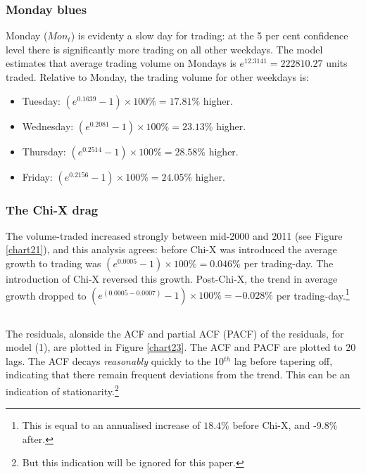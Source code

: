 \documentclass{article}\usepackage[]{graphicx}\usepackage[]{color}
\begin{document}
\subsubsection*{Monday blues}
\vspace*{-6mm}
  Monday ($Mon_t$) is evidenty a slow day for trading: at the 5 per cent confidence level there is significantly more trading on all other weekdays. 
  The model estimates that average trading volume on Mondays is $e^{12.3141}=222810.27$ units traded. Relative to Monday, the trading volume for other weekdays is:
  \begin{itemize}
    \item Tuesday:  $(e^{0.1639}-1)\times 100\%=17.81\%$  higher.
    \item Wednesday:  $(e^{0.2081}-1)\times 100\%=23.13\%$ higher. 
    \item Thursday:  $(e^{0.2514}-1)\times 100\%=28.58\%$  higher.
    \item Friday:  $(e^{0.2156}-1)\times 100\%=24.05\%$  higher.
  \end{itemize}

\subsubsection*{The Chi-X drag}
\vspace*{-6mm}
  The volume-traded increased strongly between mid-2000 and 2011 (see Figure \ref{chart21}), and this analysis agrees: before Chi-X was introduced the average growth to trading was $(e^{0.0005}-1)\times 100\%=0.046\%$ per trading-day. The introduction of Chi-X reversed this growth. Post-Chi-X, the trend in average growth dropped to $(e^{(0.0005-0.0007)}-1)\times 100\%=-0.028\%$ per trading-day.\footnote{This is equal to an annualised increase of $18.4\%$ before Chi-X, and -9.8\% after.}


\newpage
\subsection{} \label{subsec24} %


The residuals, alonside the ACF and partial ACF (PACF) of the residuals, for model (1), are plotted in Figure \ref{chart23}. The ACF and PACF are plotted to 20 lags. The ACF decays \textit{reasonably} quickly to the 10$^{th}$ lag before tapering off, indicating that there remain frequent deviations from the trend. This can be an indication of stationarity.\footnote{But this indication will be ignored for this paper.}
\end{document}
